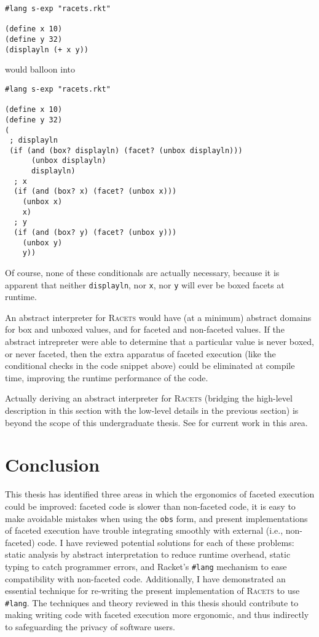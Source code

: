 \documentclass{article}
\begin{document}
\begin{lstlisting}
#lang s-exp "racets.rkt"

(define x 10)
(define y 32)
(displayln (+ x y))
\end{lstlisting}

\noindent would balloon into

\begin{lstlisting}
#lang s-exp "racets.rkt"

(define x 10)
(define y 32)
(
 ; displayln
 (if (and (box? displayln) (facet? (unbox displayln)))
      (unbox displayln)
      displayln)
  ; x
  (if (and (box? x) (facet? (unbox x)))
    (unbox x)
    x)
  ; y
  (if (and (box? y) (facet? (unbox y)))
    (unbox y)
    y))
\end{lstlisting}

Of course, none of these conditionals are actually necessary, because it is apparent that neither \texttt{displayln}, nor \texttt{x}, nor \texttt{y} will ever be boxed facets at runtime.

An abstract interpreter for \textsc{Racets} would have (at a minimum) abstract domains for box and unboxed values, and for faceted and non-faceted values. If the abstract intrepreter were able to determine that a particular value is never boxed, or never faceted, then the extra apparatus of faceted execution (like the conditional checks in the code snippet above) could be eliminated at compile time, improving the runtime performance of the code.

Actually deriving an abstract interpreter for \textsc{Racets} (bridging the high-level description in this section with the low-level details in the previous section) is beyond the scope of this undergraduate thesis. See \cite{abstract-inter} for current work in this area.



\section{Conclusion}
This thesis has identified three areas in which the ergonomics of faceted execution could be improved: faceted code is slower than non-faceted code, it is easy to make avoidable mistakes when using the \texttt{obs} form, and present implementations of faceted execution have trouble integrating smoothly with external (i.e., non-faceted) code. I have reviewed potential solutions for each of these problems: static analysis by abstract interpretation to reduce runtime overhead, static typing to catch programmer errors, and Racket's \texttt{\#lang} mechanism to ease compatibility with non-faceted code. Additionally, I have demonstrated an essential technique for re-writing the present implementation of \textsc{Racets} to use \texttt{\#lang}. The techniques and theory reviewed in this thesis should contribute to making writing code with faceted execution more ergonomic, and thus indirectly to safeguarding the privacy of software users.


\end{document}
